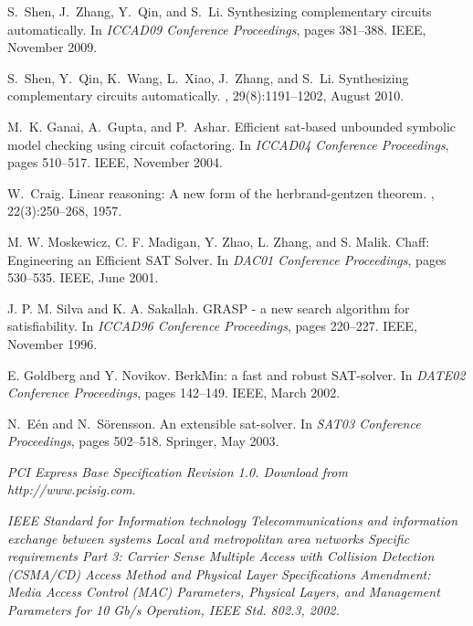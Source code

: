 \documentclass{sig-alternate}
\begin{document}
\begin{thebibliography}{10}

S.~Shen, J.~Zhang, Y.~Qin, and S.~Li.
\newblock Synthesizing complementary circuits automatically.
\newblock In {\em ICCAD09 Conference Proceedings}, pages 381--388. IEEE,
  November 2009.

S.~Shen, Y.~Qin, K.~Wang, L.~Xiao, J.~Zhang, and S.~Li.
\newblock Synthesizing complementary circuits automatically.
,
  29(8):1191--1202, August 2010.

M.~K. Ganai, A.~Gupta, and P.~Ashar.
\newblock Efficient sat-based unbounded symbolic model checking using circuit
  cofactoring.
\newblock In {\em ICCAD04 Conference Proceedings}, pages 510--517. IEEE,
  November 2004.

W.~Craig.
\newblock Linear reasoning: A new form of the herbrand-gentzen theorem.
, 22(3):250--268, 1957.

M. W. Moskewicz, C. F. Madigan, Y. Zhao, L. Zhang, and S. Malik.
\newblock Chaff: Engineering an Efficient SAT Solver.
\newblock In {\em DAC01 Conference Proceedings}, pages 530--535. IEEE, June
  2001.

J. P. M. Silva and K. A. Sakallah.
\newblock GRASP - a new search algorithm for satisfiability.
\newblock In {\em ICCAD96 Conference Proceedings}, pages 220--227. IEEE, November
  1996.

E. Goldberg and Y. Novikov.
\newblock BerkMin: a fast and robust SAT-solver.
\newblock In {\em DATE02 Conference Proceedings}, pages 142--149. IEEE, March
  2002.

N.~E\'en and N.~S\"orensson.
\newblock An extensible sat-solver.
\newblock In {\em SAT03 Conference Proceedings}, pages 502--518. Springer, May
  2003.

{\em PCI Express Base Specification Revision 1.0. Download from
  http://www.pcisig.com}.

{\em IEEE Standard for Information technology Telecommunications and
  information exchange between systems Local and metropolitan area networks
  Specific requirements Part 3: Carrier Sense Multiple Access with Collision
  Detection (CSMA/CD) Access Method and Physical Layer Specifications
  Amendment: Media Access Control (MAC) Parameters, Physical Layers, and
  Management Parameters for 10 Gb/s Operation, IEEE Std. 802.3, 2002.}


\end{thebibliography}
\end{document}
